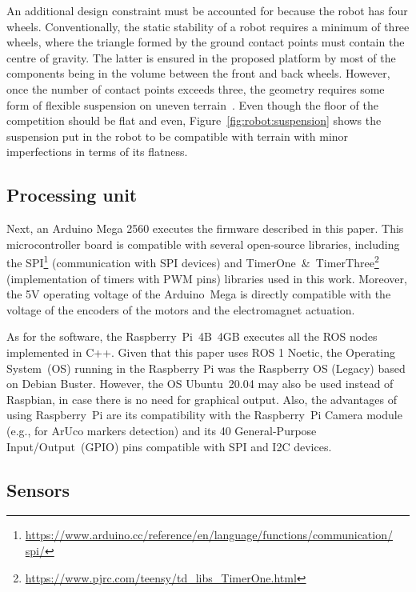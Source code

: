 \documentclass[conference]{IEEEtran}
\begin{document}
An additional design constraint must be accounted for because the robot has four wheels.
Conventionally, the static stability of a robot requires a minimum of three wheels, where the triangle formed by the ground contact points must contain the centre of gravity. The latter is ensured in the proposed platform by most of the components being in the volume between the front and back wheels.
However, once the number of contact points exceeds three, the geometry requires some form of flexible suspension on uneven terrain~\cite{book:intro-robotics}.
Even though the floor of the competition should be flat and even, Figure~\ref{fig:robot:suspension} shows the suspension put in the robot to be compatible with terrain with minor imperfections in terms of its flatness.



\subsection{Processing unit}

Next, an Arduino Mega 2560 executes the firmware described in this paper. This microcontroller board is compatible with several open-source libraries, including the SPI\footnote{\href{https://www.arduino.cc/reference/en/language/functions/communication/spi/}{https://www.arduino.cc/reference/en/language/functions/communication/\\spi/}} (communication with SPI devices) and TimerOne~\&~TimerThree\footnote{\label{note:timers-lib}\url{https://www.pjrc.com/teensy/td_libs_TimerOne.html}} (implementation of timers with PWM pins) libraries used in this work.
Moreover, the 5V operating voltage of the Arduino~Mega is directly compatible with the voltage of the encoders of the motors and the electromagnet actuation.

As for the software, the Raspberry~Pi~4B~4GB executes all the ROS nodes implemented in C++.
Given that this paper uses ROS 1 Noetic, the Operating System~(OS) running in the Raspberry Pi was the Raspberry OS (Legacy) based on Debian Buster.
However, the OS Ubuntu~20.04 may also be used instead of Raspbian, in case there is no need for graphical output.
Also, the advantages of using Raspberry~Pi are its compatibility with the Raspberry~Pi Camera module (e.g., for ArUco markers detection) and its 40 General-Purpose Input/Output~(GPIO) pins compatible with SPI and I2C devices.



\subsection{Sensors}
\end{document}
